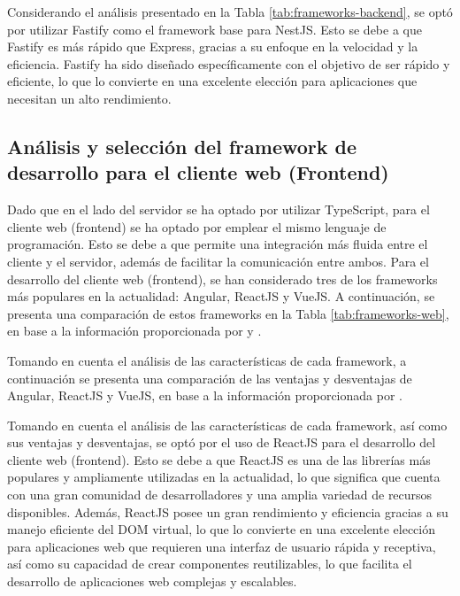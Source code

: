 Considerando el análisis presentado en la Tabla \ref{tab:frameworks-backend}, se optó por utilizar Fastify como
el framework base para NestJS. Esto se debe a que Fastify es más rápido que Express, gracias a su enfoque en la
velocidad y la eficiencia. Fastify ha sido diseñado específicamente con el objetivo de ser rápido y eficiente,
lo que lo convierte en una excelente elección para aplicaciones que necesitan un alto rendimiento.

\subsection{Análisis y selección del framework de desarrollo para el cliente web (Frontend)}

Dado que en el lado del servidor se ha optado por utilizar TypeScript, para el cliente web (frontend) se ha optado
por emplear el mismo lenguaje de programación. Esto se debe a que permite una integración más fluida entre el
cliente y el servidor, además de facilitar la comunicación entre ambos. Para el desarrollo del cliente web
(frontend), se han considerado tres de los frameworks más populares en la actualidad: Angular, ReactJS y VueJS.
A continuación, se presenta una comparación de estos frameworks en la Tabla \ref{tab:frameworks-web}, en base a la
información proporcionada por  \cite{remacheganayAPLICATIVOWEBUTILIZANDO} y \cite{StackOverflowDeveloper}.



Tomando en cuenta el análisis de las características de cada framework, a continuación se presenta una comparación
de las ventajas y desventajas de Angular, ReactJS y VueJS, en base a la información proporcionada por \cite{xingResearchAnalysisFrontend2019a}.




Tomando en cuenta el análisis de las características de cada framework, así como sus ventajas y desventajas, se
optó por el uso de ReactJS para el desarrollo del cliente web (frontend). Esto se debe a que ReactJS es una de
las librerías más populares y ampliamente utilizadas en la actualidad, lo que significa que cuenta con una gran
comunidad de desarrolladores y una amplia variedad de recursos disponibles. Además, ReactJS posee un gran
rendimiento y eficiencia gracias a su manejo eficiente del DOM virtual, lo que lo convierte en una excelente
elección para aplicaciones web que requieren una interfaz de usuario rápida y receptiva, así como su capacidad
de crear componentes reutilizables, lo que facilita el desarrollo de aplicaciones web complejas y escalables.

